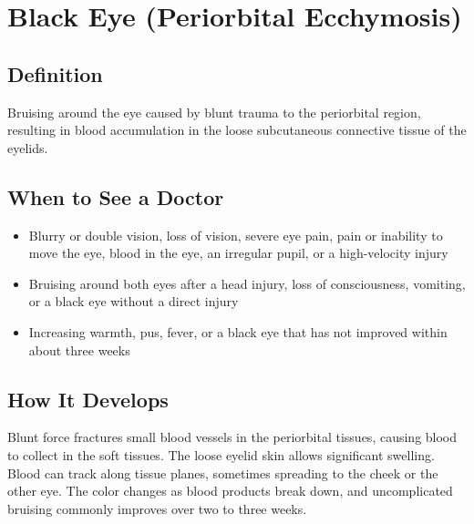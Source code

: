 \chapter{Black Eye (Periorbital Ecchymosis)}

\section*{Definition}
Bruising around the eye caused by blunt trauma to the periorbital region, resulting in blood accumulation in the loose subcutaneous connective tissue of the eyelids.

\section*{When to See a Doctor}

\begin{itemize}
 \item Blurry or double vision, loss of vision, severe eye pain, pain or inability to move the eye, blood in the eye, an irregular pupil, or a high-velocity injury
 \item Bruising around both eyes after a head injury, loss of consciousness, vomiting, or a black eye without a direct injury
 \item Increasing warmth, pus, fever, or a black eye that has not improved within about three weeks
\end{itemize}

\section*{How It Develops}
Blunt force fractures small blood vessels in the periorbital tissues, causing blood to collect in the soft tissues. The loose eyelid skin allows significant swelling. Blood can track along tissue planes, sometimes spreading to the cheek or the other eye. The color changes as blood products break down, and uncomplicated bruising commonly improves over two to three weeks.

